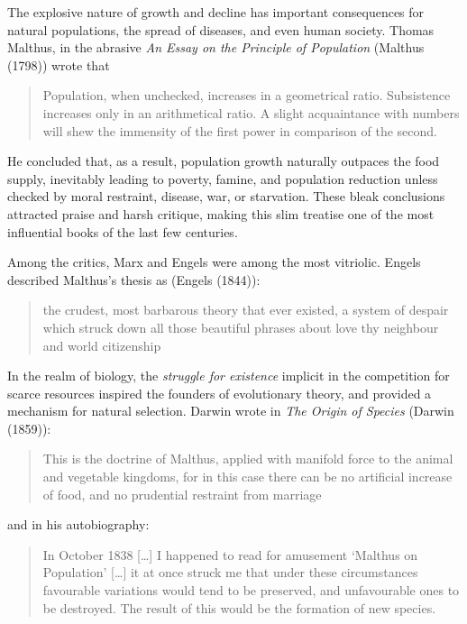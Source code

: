 \documentclass[
  letterpaper,
]{scrbook}
\begin{document}
The explosive nature of growth and decline has important consequences
for natural populations, the spread of diseases, and even human society.
Thomas Malthus, in the abrasive \emph{An Essay on the Principle of
Population} (Malthus (1798)) wrote that

\begin{quote}
Population, when unchecked, increases in a geometrical ratio.
Subsistence increases only in an arithmetical ratio. A slight
acquaintance with numbers will shew the immensity of the first power in
comparison of the second.
\end{quote}

He concluded that, as a result, population growth naturally outpaces the
food supply, inevitably leading to poverty, famine, and population
reduction unless checked by moral restraint, disease, war, or
starvation. These bleak conclusions attracted praise and harsh critique,
making this slim treatise one of the most influential books of the last
few centuries.

Among the critics, Marx and Engels were among the most vitriolic. Engels
described Malthus's thesis as (Engels (1844)):

\begin{quote}
the crudest, most barbarous theory that ever existed, a system of
despair which struck down all those beautiful phrases about love thy
neighbour and world citizenship
\end{quote}

In the realm of biology, the \emph{struggle for existence} implicit in
the competition for scarce resources inspired the founders of
evolutionary theory, and provided a mechanism for natural selection.
Darwin wrote in \emph{The Origin of Species} (Darwin (1859)):

\begin{quote}
This is the doctrine of Malthus, applied with manifold force to the
animal and vegetable kingdoms, for in this case there can be no
artificial increase of food, and no prudential restraint from marriage
\end{quote}

and in his autobiography:

\begin{quote}
In October 1838 {[}\ldots{]} I happened to read for amusement `Malthus
on Population' {[}\ldots{]} it at once struck me that under these
circumstances favourable variations would tend to be preserved, and
unfavourable ones to be destroyed. The result of this would be the
formation of new species.
\end{quote}
\end{document}
